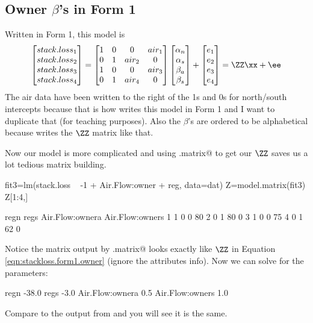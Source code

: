 \subsection{Owner $\beta$'s in Form 1}
Written in Form 1, this model is
\begin{equation}\label{eqn:stackloss.form1.owner}
\begin{bmatrix}stack.loss_1\\ stack.loss_2\\ stack.loss_3\\ stack.loss_4\end{bmatrix}
= 
\begin{bmatrix}1&0&0&air_1\\ 0&1&air_2&0 \\ 1&0&0&air_3\\ 0&1&air_4&0\end{bmatrix}
\begin{bmatrix}\alpha_n \\ \alpha_s \\ \beta_a \\ \beta_s \end{bmatrix}
+
\begin{bmatrix}e_1\\e_2\\e_3\\e_4\end{bmatrix}=\ZZ\xx+\ee
\end{equation}
The air data have been written to the right of the 1s and 0s for north/south intercepts because that is how \verb@lm@ writes this model in Form 1 and I want to duplicate that (for teaching purposes). Also the $\beta$'s are ordered to be alphabetical because \verb@lm@ writes the $\ZZ$ matrix like that.

Now our model is more complicated and using \verb@model.matrix@ to get our $\ZZ$ saves us a lot tedious matrix building.
\begin{Schunk}
\begin{Sinput}
 fit3=lm(stack.loss ~ -1 + Air.Flow:owner + reg, data=dat)
 Z=model.matrix(fit3)
 Z[1:4,]
\end{Sinput}
\begin{Soutput}
  regn regs Air.Flow:ownera Air.Flow:owners
1    1    0               0              80
2    0    1              80               0
3    1    0               0              75
4    0    1              62               0
\end{Soutput}
\end{Schunk}
Notice the matrix output by \verb@model.matrix@ looks exactly like $\ZZ$ in Equation \ref{eqn:stackloss.form1.owner} (ignore the attributes info).  Now we can solve for the parameters:
\begin{Schunk}
\begin{Soutput}
                 [,1]
regn            -38.0
regs             -3.0
Air.Flow:ownera   0.5
Air.Flow:owners   1.0
\end{Soutput}
\end{Schunk}
Compare to the output from \verb@lm@ and you will see it is the same. 

